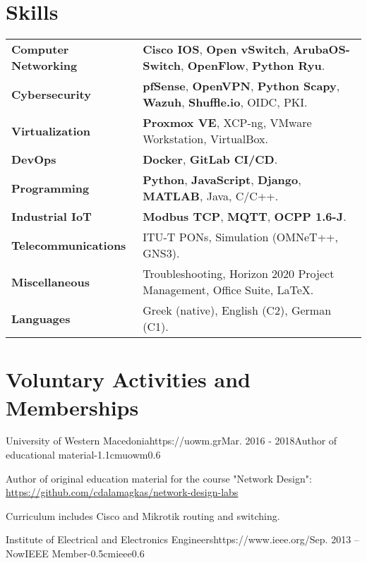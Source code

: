 \documentclass{mycv}
\begin{document}
	\section{Skills}
	\begin{tabular}{m{4.5cm} m{13cm}}\renewcommand{\arraystretch}{2}
		\textbf{Computer Networking}   	& \textbf{Cisco IOS}, \textbf{Open vSwitch}, \textbf{ArubaOS-Switch}, \textbf{OpenFlow}, \textbf{Python Ryu}.\\
		\textbf{Cybersecurity}			& \textbf{pfSense}, \textbf{OpenVPN}, \textbf{Python Scapy}, \textbf{Wazuh}, \textbf{Shuffle.io}, OIDC, PKI.\\
		\textbf{Virtualization}			& \textbf{Proxmox VE}, XCP-ng, VMware Workstation, VirtualBox.\\ 
		\textbf{DevOps}					& \textbf{Docker}, \textbf{GitLab CI/CD}. \\
		\textbf{Programming} 	    	& \textbf{Python}, \textbf{JavaScript}, \textbf{Django}, \textbf{MATLAB}, Java, C/C++. \\
		\textbf{Industrial IoT}			& \textbf{Modbus TCP}, \textbf{MQTT}, \textbf{OCPP 1.6-J}.\\
		\textbf{Telecommunications}   	& ITU-T PONs, Simulation (OMNeT++, GNS3). \\
		\textbf{Miscellaneous}			& Troubleshooting, Horizon 2020 Project Management, Office Suite, \LaTeX. \\
		\textbf{Languages} 				& Greek (native), English (C2), German (C1).
	\end{tabular}

	\section{Voluntary Activities and Memberships}
	\vspace*{0.125cm}	
	\begin{EntryDatedLogo}{University of Western Macedonia}{https://uowm.gr}{Mar. 2016 - 2018}{Author of educational material}{-1.1cm}{uowm}{0.6}
		\begin{Itemize}
			\item Author of original education material for the course "Network Design": \url{https://github.com/cdalamagkas/network-design-labs}
			\item Curriculum includes Cisco and Mikrotik routing and switching.
		\end{Itemize}
	\end{EntryDatedLogo}

	\vspace*{0.5cm}

	\begin{EntryDatedLogo}{Institute of Electrical and Electronics Engineers}{https://www.ieee.org/}{Sep. 2013 -- Now}{IEEE Member}{-0.5cm}{ieee}{0.6}
	\end{EntryDatedLogo}

\end{document}
